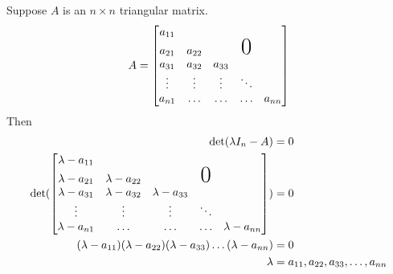\documentclass[12pt]{article}
\begin{document}
Suppose $A$ is an $n \times n$ triangular matrix. $$A = \begin{bmatrix} a_{11} \\ a_{21} & a_{22} & & \text{\huge0} \\ a_{31} & a_{32} & a_{33}  \\ \vdots & \vdots & \vdots &\ddots \\ a_{n1} & \hdots & \hdots & \hdots & a_{nn} \end{bmatrix}$$ Then $$\begin{aligned} \det(\lambda I_n - A ) &= 0 \\ \det(\begin{bmatrix} \lambda - a_{11} \\ \lambda - a_{21} & \lambda - a_{22} & & \text{\huge0} \\ \lambda - a_{31} & \lambda - a_{32} & \lambda - a_{33}  \\ \vdots & \vdots & \vdots &\ddots \\ \lambda - a_{n1} & \hdots & \hdots & \hdots & \lambda - a_{nn} \end{bmatrix}) &= 0 \\ (\lambda - a_{11})(\lambda - a_{22})(\lambda - a_{33})\dots(\lambda - a_{nn}) &= 0 \\ \lambda &= a_{11}, a_{22}, a_{33}, \dots, a_{nn} \end{aligned} $$ \newpage
\end{document}
